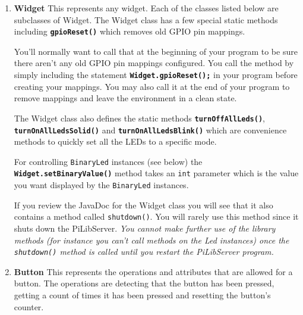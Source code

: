 \begin{enumerate}
	\item \textbf{Widget} \newline
	This represents any widget. Each of the classes listed below are subclasses of Widget. The Widget class has a few special static methods including \textbf{\texttt{gpioReset()}} which removes old GPIO pin mappings.
	

	You'll normally want to call that at the beginning of your program to be sure there aren't any old GPIO pin mappings configured. You call the method by simply including the statement \textbf{\texttt{Widget.gpioReset();}} in your program before creating your mappings. You may also call it at the end of your program to remove mappings and leave the environment in a clean state. 
	
	The Widget class also defines the static methods \textbf{\texttt{turnOffAllLeds()}}, \textbf{\texttt{turnOnAllLedsSolid()}} and \textbf{\texttt{turnOnAllLedsBlink()}} which are convenience methods to quickly set all the LEDs to a specific mode.

	
	For controlling \texttt{BinaryLed} instances (see below) the \textbf{\texttt{Widget.setBinaryValue()}} method takes an \texttt{int} parameter which is the value you want displayed by the \texttt{BinaryLed} instances.
	

	If you review the JavaDoc for the Widget class you will see that it also contains a method called \texttt{shutdown()}. You will rarely use this method since it shuts down the PiLibServer. \textit{You cannot make further use of the library methods (for instance you can't call methods on the Led instances) once the  \texttt{shutdown()} method is called until you restart the PiLibServer program.} 

	\item \textbf{Button} \newline
	This represents the operations and attributes that are allowed for a button. The operations are detecting that the button has been pressed, getting a count of times it has been pressed and resetting the button's counter.
	

\end{enumerate}
